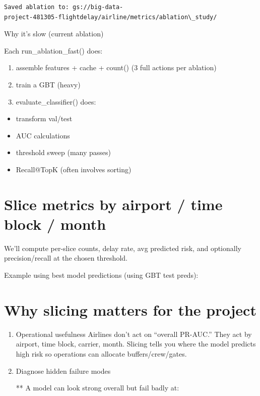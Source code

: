 \documentclass[11pt]{article}
\providecommand{\tightlist}{%
      \setlength{\itemsep}{0pt}\setlength{\parskip}{0pt}}
\begin{document}
    \begin{Verbatim}[commandchars=\\\{\}]

    \end{Verbatim}

    \begin{Verbatim}[commandchars=\\\{\}]
Saved ablation to: gs://big-data-
project-481305-flightdelay/airline/metrics/ablation\_study/
    \end{Verbatim}

    Why it's slow (current ablation)

Each run\_ablation\_fast() does:

\begin{enumerate}
\def\labelenumi{\arabic{enumi}.}
\item
  assemble features + cache + count() (3 full actions per ablation)
\item
  train a GBT (heavy)
\item
  evaluate\_classifier() does:
\end{enumerate}

\begin{itemize}
\tightlist
\item
  transform val/test
\item
  AUC calculations
\item
  threshold sweep (many passes)
\item
  Recall@TopK (often involves sorting)
\end{itemize}

    \section{Slice metrics by airport / time block /
month}\label{slice-metrics-by-airport-time-block-month}

We'll compute per-slice counts, delay rate, avg predicted risk, and
optionally precision/recall at the chosen threshold.

    Example using best model predictions (using GBT test preds):

    \section{Why slicing matters for the
project}\label{why-slicing-matters-for-the-project}

\begin{enumerate}
\def\labelenumi{\arabic{enumi}.}
\item
  Operational usefulness Airlines don't act on ``overall PR-AUC.'' They
  act by airport, time block, carrier, month. Slicing tells you where
  the model predicts high risk so operations can allocate
  buffers/crew/gates.
\item
  Diagnose hidden failure modes

  ** A model can look strong overall but fail badly at:
\end{enumerate}
\end{document}
